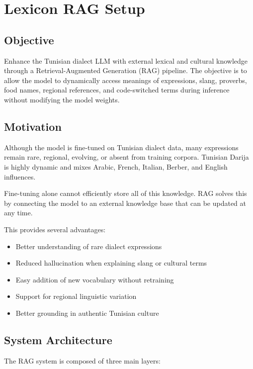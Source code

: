 \documentclass[12pt,a4paper]{report}
\begin{document}
\section{Lexicon RAG Setup}

\subsection{Objective}

Enhance the Tunisian dialect LLM with external lexical and cultural knowledge
through a Retrieval-Augmented Generation (RAG) pipeline. The objective is to allow
the model to dynamically access meanings of expressions, slang, proverbs, food names,
regional references, and code-switched terms during inference without modifying the
model weights.

\subsection{Motivation}

Although the model is fine-tuned on Tunisian dialect data, many expressions remain
rare, regional, evolving, or absent from training corpora. Tunisian Darija is highly
dynamic and mixes Arabic, French, Italian, Berber, and English influences.

Fine-tuning alone cannot efficiently store all of this knowledge. RAG solves this by
connecting the model to an external knowledge base that can be updated at any time.

This provides several advantages:

\begin{itemize}
    \item Better understanding of rare dialect expressions
    \item Reduced hallucination when explaining slang or cultural terms
    \item Easy addition of new vocabulary without retraining
    \item Support for regional linguistic variation
    \item Better grounding in authentic Tunisian culture
\end{itemize}

\subsection{System Architecture}

The RAG system is composed of three main layers:
\end{document}
